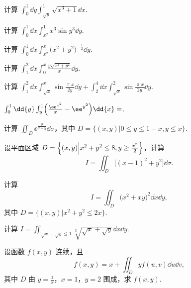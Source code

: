 	\begin{ti}
		计算 $\int_{0}^{1} \dd{y} \int_{\sqrt{y}}^{1} \sqrt{x^{3} + 1} \dd{x}$.
	\end{ti}

	\begin{ti}
		计算 $\int_{0}^{1} \dd{x} \int_{x^{2}}^{1} x^{3} \sin y^{3} \dd{y}$.
	\end{ti}

	\begin{ti}
		计算 $\int_{0}^{1} \dd{x} \int_{x^{2}}^{x} \bigl( x^{2} + y^{2} \bigr)^{-\frac{1}{2}} \dd{y}$.
	\end{ti}

	\begin{ti}
		计算 $\int_{1}^{2} \dd{x} \int_{0}^{x} \frac{y \sqrt{x^{2} + y^{2}}}{x} \dd{y}$.
	\end{ti}

	\begin{ti}
		计算 $\int_{1}^{2} \dd{x} \int_{\sqrt{x}}^{x} \sin \frac{\uppi x}{2y} \dd{y} + \int_{2}^{4} \dd{x} \int_{\sqrt{x}}^{2} \sin \frac{\uppi x}{2y} \dd{y}$.
	\end{ti}

	\begin{ti}
		$\int_{0}^{1} \dd{y} \int_{y}^{1} \Bigl( \frac{\ee^{x^{2}}}{x} - \ee^{y^{2}} \Bigr) \dd{x} = $\htwo.
	\end{ti}

	\begin{ti}
		计算 $\iint_{D} \ee^{\frac{y}{x + y}} \dd{\sigma}$，其中 $D = \bigl\{ (x,y) \bigl| 0 \leq y \leq 1 - x, y \leq x \bigr\}$.
	\end{ti}

	\begin{ti}
		设平面区域 $D = \Bigl\{ (x,y) \Bigl| x^{2} + y^{2} \leq 8, y \geq \frac{x^{2}}{2} \Bigr\}$，计算
		\[
			I = \iint_{D} \bigl[ (x - 1)^{2} + y^{2} \bigr] \dd{\sigma}.
		\]
	\end{ti}

	\begin{ti}
		计算
		\[
			I = \iint_{D} \bigl( x^{2} + xy \bigr)^{2} \dd{x} \dd{y},
		\]
		其中 $D = \bigl\{ (x,y) \bigl| x^{2} + y^{2} \leq 2x \bigr\}$.
	\end{ti}

	\begin{ti}
		计算 $I = \iint_{\sqrt{x} + \sqrt{y} \leq 1} \sqrt[3]{\sqrt{x} + \sqrt{y}} \dd{x} \dd{y}$.
	\end{ti}

	\begin{ti}
		设函数 $f(x,y)$ 连续，且
		\[
			f(x,y) = x + \iint_{D} y f(u,v) \dd{u} \dd{v},
		\]
		其中 $D$ 由 $y = \frac{1}{x}$，$x = 1$，$y = 2$ 围成，求 $f(x,y)$.
	\end{ti}

